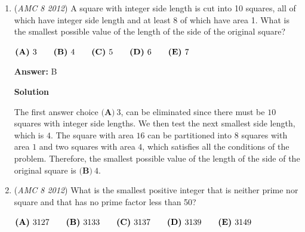 \begin{enumerate}
 The fourth digit must be $3$ or $2$. This cancels out $\textbf{(E)}\ 97403$. 

 This leaves us with $\boxed{\textbf{(C)}\ 87431}$.

 



\textbf{Solution 3}

If we use intuition, we know that the digits will be IN ORDER, to maximze the number. This eliminates $\textbf{(B)}$, $\textbf{(D)}$,and $\textbf{(E)}$. Additionally, the 2 two numbers must have 9 or 8 for the first digit to maximize the sum, eliminating $\textbf{(A)}$. This leaves $\boxed{\textbf{(C)}\ 87431}$.-written by litttle\_master purely, not copied from anywhere

 


	\item (\textit{AMC 8 2012}) A square with integer side length is cut into 10 squares, all of which have integer side length and at least 8 of which have area 1. What is the smallest possible value of the length of the side of the original square?


 $\textbf{(A)}\hspace{.05in}3\qquad\textbf{(B)}\hspace{.05in}4\qquad\textbf{(C)}\hspace{.05in}5\qquad\textbf{(D)}\hspace{.05in}6\qquad\textbf{(E)}\hspace{.05in}7$

 \textbf{Answer: }B



\textbf{Solution}

The first answer choice ${\textbf{(A)}\ 3}$, can be eliminated since there must be $10$ squares with integer side lengths. We then test the next smallest side length, which is $4$. The square with area $16$ can be partitioned into $8$ squares with area $1$ and two squares with area $4$, which satisfies all the conditions of the problem. Therefore, the smallest possible value of the length of the side of the original square is $\boxed{\textbf{(B)}\ 4}$.

 


	\item (\textit{AMC 8 2012}) What is the smallest positive integer that is neither prime nor square and that has no prime factor less than 50?


 $\textbf{(A)}\hspace{.05in}3127\qquad\textbf{(B)}\hspace{.05in}3133\qquad\textbf{(C)}\hspace{.05in}3137\qquad\textbf{(D)}\hspace{.05in}3139\qquad\textbf{(E)}\hspace{.05in}3149$


\end{enumerate}
